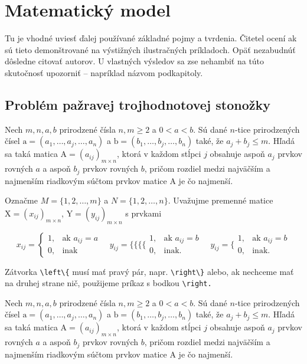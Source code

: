 \chapter{Matematický model}

Tu je vhodné uviesť ďalej používané základné pojmy a tvrdenia. 
Čitetel ocení ak sú tieto demonštrované na výstižných ilustračných príkladoch. 
Opäť nezabudnúť dôsledne citovať autorov. 
U vlastných výsledov sa zse nehambiť na túto skutočnosť upozorniť -- napríklad názvom podkapitoly.


\section{Problém pažravej trojhodnotovej stonožky}

Nech $m,n,a,b$ prirodzené čísla $n,m \ge 2$ a $0<a<b$. 
Sú dané $n$-tice prirodzených čísel ${\mathrm a}=(a_1,\dots,a_j,\dots,a_n)$
a ${\mathrm b}=(b_1,\dots,b_j,\dots,b_n)$ také, že $a_j+b_j \le m$.
Hľadá sa taká matica ${\mathrm A}=(a_{ij})_{m\times n}$, ktorá v každom
stĺpci $j$ obsahuje aspoň $a_j$ prvkov rovných $a$ a aspoň $b_j$ prvkov rovných $b$,
pričom rozdiel medzi najväčším a najmenším  riadkovým súčtom prvkov matice ${\mathrm A}$ 
je čo najmenší.

Označme $M=\{1,2,\dots,m\}$ a $N=\{1,2,\dots,n\}$. 
Uvažujme premenné matice 
${\mathrm X} = (x_{ij})_{m\times n}$, ${\mathrm Y}=(y_{ij})_{m\times n}$ s prvkami

$$
x_{ij}=\left\{\begin{array}{ll}
	 1, &\mbox{ak } a_{ij}=a \\
	 0, &\text{inak}         \end{array}\right.
\quad 
y_{ij}=\Bigg\{\bigg\{\Big\{\big\{\begin{array}{ll}
	 1, &\mbox{ak } a_{ij}=b \\
	 0, &\mbox{inak}.        \end{array}
\quad 
y_{ij}=\Big\{\begin{array}{ll}
	 1, &\mbox{ak } a_{ij}=b \\[-.5em]
	 0, &\mbox{inak}.        \end{array}
$$

Zátvorka \verb|\left\{| musí mať pravý pár,  napr. \verb|\right\}|  alebo,  ak nechceme mať na
druhej strane nič, použijeme príkaz s bodkou \verb|\right.|

Nech $m,n,a,b$ prirodzené čísla $n,m \ge 2$ a $0<a<b$. 
Sú dané $n$-tice prirodzených čísel ${\mathrm a}=(a_1,\dots,a_j,\dots,a_n)$
a ${\mathrm b}=(b_1,\dots,b_j,\dots,b_n)$ také, že $a_j+b_j \le m$.
Hľadá sa taká matica ${\mathrm A}=(a_{ij})_{m\times n}$, ktorá v každom
stĺpci $j$ obsahuje aspoň $a_j$ prvkov rovných $a$ a aspoň $b_j$ prvkov rovných $b$,
pričom rozdiel medzi najväčším a najmenším  riadkovým súčtom prvkov matice ${\mathrm A}$ 
je čo najmenší.



